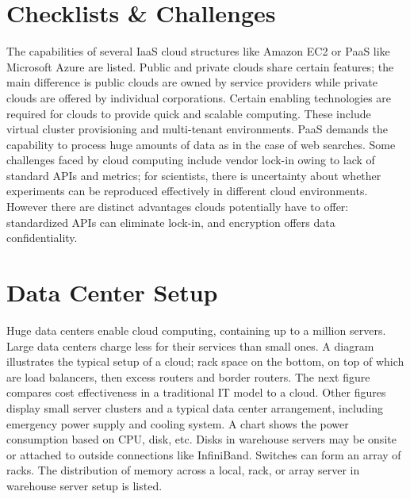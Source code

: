 
\section{Checklists \& Challenges}

The capabilities of several IaaS cloud structures like Amazon EC2 or
PaaS like Microsoft Azure are listed. Public and private clouds share
certain features; the main difference is public clouds are owned by
service providers while private clouds are offered by individual
corporations. Certain enabling technologies are required for clouds to
provide quick and scalable computing. These include virtual cluster
provisioning and multi-tenant environments. PaaS demands the capability
to process huge amounts of data as in the case of web searches. Some
challenges faced by cloud computing include vendor lock-in owing to lack
of standard APIs and metrics; for scientists, there is uncertainty about
whether experiments can be reproduced effectively in different cloud
environments. However there are distinct advantages clouds potentially
have to offer: standardized APIs can eliminate lock-in, and encryption
offers data confidentiality.


\section{Data Center Setup}

Huge data centers enable cloud computing, containing up to a million
servers. Large data centers charge less for their services than small
ones. A diagram illustrates the typical setup of a cloud; rack space on
the bottom, on top of which are load balancers, then excess routers and
border routers. The next figure compares cost effectiveness in a
traditional IT model to a cloud. Other figures display small server
clusters and a typical data center arrangement, including emergency
power supply and cooling system. A chart shows the power consumption
based on CPU, disk, etc. Disks in warehouse servers may be onsite or
attached to outside connections like InfiniBand. Switches can form an
array of racks. The distribution of memory across a local, rack, or
array server in warehouse server setup is listed.

